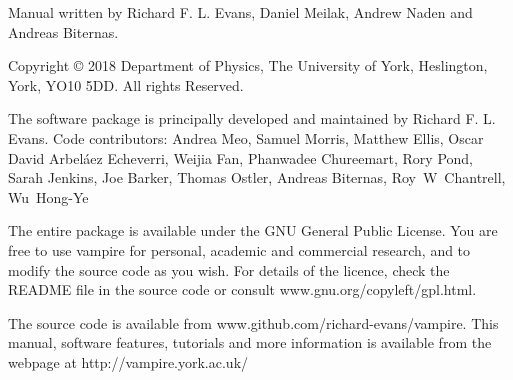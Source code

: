 \noindent Manual written by Richard F. L. Evans, Daniel Meilak, Andrew Naden and Andreas Biternas.\\
\par
\noindent Copyright \copyright \xspace 2018 Department of Physics, The University of York, Heslington, York, YO10 5DD. All rights Reserved.\\
\par
\noindent The \vampire software package is principally developed and maintained by Richard F. L. Evans. Code contributors: Andrea Meo, Samuel Morris, Matthew Ellis, Oscar David Arbel\'aez Echeverri, Weijia Fan, Phanwadee Chureemart, Rory Pond, Sarah Jenkins, Joe Barker, Thomas Ostler, Andreas Biternas, Roy~W~Chantrell, Wu~Hong-Ye\\
\par
\noindent The entire \vampire package is available under the GNU General Public License. You are free to use vampire for personal, academic and commercial research, and to modify the source code as you wish. For details of the licence, check the README file in the source code or consult www.gnu.org/copyleft/gpl.html.\\
\par
\noindent The \vampire source code is available from www.github.com/richard-evans/vampire. This manual, software features, tutorials and more information is available from the \vampire webpage at http://vampire.york.ac.uk/\\

